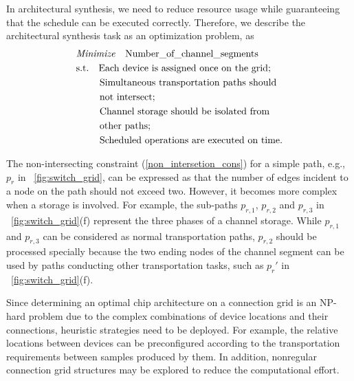 In architectural synthesis, we need to reduce resource usage 
while guaranteeing that the schedule can be executed correctly. Therefore, we 
describe the architectural synthesis task as an optimization problem, as
\begin{align} \label{eq:min_channel_obj}
&\text{\textit{Minimize}}  \quad \text{Number\_of\_channel\_segments}\\ 
&\text{s.t.}  \quad \text{Each device is assigned once on the grid;} \\
& \qquad\;\,  \text{Simultaneous transportation paths should } \nonumber\\
&\qquad\;\, \text{not intersect;} \label{non_intersetion_cons}\\
&\qquad\;\,\text{Channel storage should be isolated from}\nonumber\\
&\qquad \;\,\text{other paths;} \\
&\qquad\;\,\text{Scheduled operations are executed on time.}
\end{align}

The non-intersecting constraint (\ref{non_intersetion_cons}) for a simple path, e.g., $p_r$ in
\figname~\ref{fig:switch_grid}, can be expressed as that the number of edges incident  
to a node on the path should not exceed two.
However, it becomes more complex when a storage is involved.
For example, the sub-paths $p_{r,1}$, $p_{r,2}$ and $p_{r,3}$
in \figname~\ref{fig:switch_grid}(f) represent the three phases of a channel
storage. While $p_{r,1}$ and $p_{r,3}$ can be considered as normal
transportation paths, $p_{r,2}$ should be processed specially because the two
ending nodes of the channel segment can be used by paths conducting other
transportation tasks, such as $p_r'$ in \figname~\ref{fig:switch_grid}(f). 


Since determining an optimal chip architecture on a connection grid is an
NP-hard problem due to the complex combinations of device locations and their
connections, heuristic strategies need to be deployed. For example, the
relative locations between devices can be preconfigured according to the
transportation requirements between samples produced by them. In addition,
nonregular connection grid structures may be explored to reduce the
computational effort. 
 
